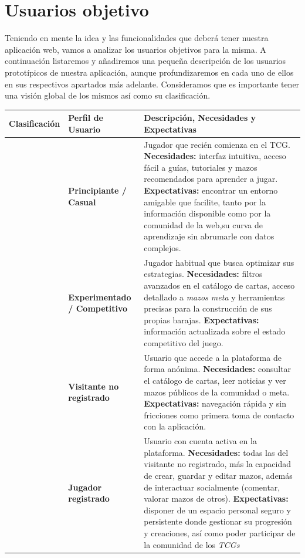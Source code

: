 \documentclass[10pt]{article}
\begin{document}
	\section{Usuarios objetivo}       
	Teniendo en mente la idea y las funcionalidades que deberá tener nuestra aplicación web, vamos a analizar los usuarios objetivos para la misma.
	A continuación listaremos y añadiremos una pequeña descripción de los usuarios prototípicos de nuestra aplicación, aunque profundizaremos en cada uno de ellos en sus respectivos apartados más adelante. Consideramos que es importante tener una visión global de los mismos así como su clasificación.
	\begin{table}[H]
		\centering
		\renewcommand{\arraystretch}{1.5} %
		\begin{tabularx}{\textwidth}{|>{\raggedright\arraybackslash}p{3cm}|>{\raggedright\arraybackslash}p{4cm}|>{\raggedright\arraybackslash}X|}
			\hline
			\textbf{Clasificación} & \textbf{Perfil de Usuario} & \textbf{Descripción, Necesidades y Expectativas} \\
			\hline
			\multirow{2}{=}{\textbf{Según conocimiento del juego}} 
			& \textbf{Principiante / Casual} & Jugador que recién comienza en el TCG. \textbf{Necesidades:} interfaz intuitiva, acceso fácil a guías, tutoriales y mazos recomendados para aprender a jugar. \textbf{Expectativas:} encontrar un entorno amigable que facilite, tanto por la información disponible como por la comunidad de la web,su curva de aprendizaje sin abrumarle con datos complejos. \\
			\cline{2-3}
			& \textbf{Experimentado / Competitivo} & Jugador habitual que busca optimizar sus estrategias. \textbf{Necesidades:} filtros avanzados en el catálogo de cartas, acceso detallado a \textit{mazos meta} y herramientas precisas para la construcción de sus propias barajas. \textbf{Expectativas:} información actualizada sobre el estado competitivo del juego. \\
			\hline
			\multirow{3}{=}{\textbf{Según nivel de acceso}} 
			& \textbf{Visitante no registrado} & Usuario que accede a la plataforma de forma anónima. \textbf{Necesidades:} consultar el catálogo de cartas, leer noticias y ver mazos públicos de la comunidad o meta. \textbf{Expectativas:} navegación rápida y sin fricciones como primera toma de contacto con la aplicación. \\
			\cline{2-3}
			& \textbf{Jugador registrado} & Usuario con cuenta activa en la plataforma. \textbf{Necesidades:} todas las del visitante no registrado, más la capacidad de crear, guardar y editar mazos, además de interactuar socialmente (comentar, valorar mazos de otros). \textbf{Expectativas:} disponer de un espacio personal seguro y persistente donde gestionar su progresión y creaciones, así como poder participar de la comunidad de los \textit{TCGs} \\

\end{tabularx}
\end{table}
\end{document}
